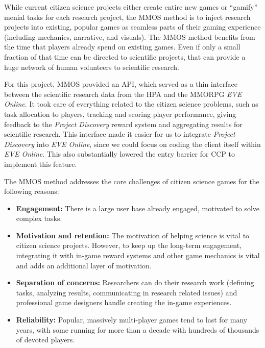 While current citizen science projects either create entire new games or ``gamify'' menial tasks for each research project, the MMOS method is to inject research projects into existing, popular games as seamless parts of their gaming experience (including mechanics, narrative, and visuals). The MMOS method benefits from the time that players already spend on existing games. Even if only a small fraction of that time can be directed to scientific projects, that can provide a huge network of human volunteers to scientific research.

For this project, MMOS provided an API, which served as a thin interface between the scientific research data from the HPA and the MMORPG \emph{EVE Online}. It took care of everything related to the citizen science problems, such as task allocation to players, tracking and scoring player performance, giving feedback to the \emph{Project Discovery} reward system and aggregating results for scientific research. This interface made it easier for us to integrate \emph{Project Discovery} into \emph{EVE Online}, since we could focus on coding the client itself within \emph{EVE Online}. This also substantially lowered the entry barrier for CCP to implement this feature.

The MMOS method addresses the core challenges of citizen science games for the following reasons:

\begin{itemize}
\item {\bf Engagement:} There is a large user base already engaged, motivated to solve complex tasks.

\item {\bf Motivation and retention:} The motivation of helping 
science is vital to citizen science projects. However, to keep up the long-term engagement, integrating it with in-game reward systems and other game mechanics is vital and adds an additional layer of motivation.

\item {\bf Separation of concerns:} Researchers can do their research work (defining tasks, analyzing results, communicating in research related issues) and professional game designers handle creating the in-game experiences.

\item {\bf Reliability:} Popular, massively multi-player games tend to last for many years, with some running for more than a decade with hundreds of thousands of devoted players.
\end{itemize}

